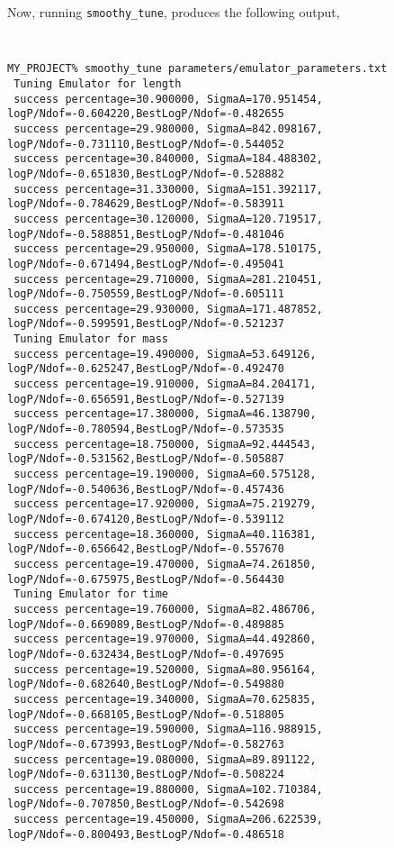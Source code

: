 \documentclass[UserManual.tex]{subfiles}
\begin{document}
Now, running {\tt smoothy\_tune}, produces the following output,

{\tt
\begin{verbatim}
MY_PROJECT% smoothy_tune parameters/emulator_parameters.txt
 Tuning Emulator for length
 success percentage=30.900000, SigmaA=170.951454, logP/Ndof=-0.604220,BestLogP/Ndof=-0.482655
 success percentage=29.980000, SigmaA=842.098167, logP/Ndof=-0.731110,BestLogP/Ndof=-0.544052
 success percentage=30.840000, SigmaA=184.488302, logP/Ndof=-0.651830,BestLogP/Ndof=-0.528882
 success percentage=31.330000, SigmaA=151.392117, logP/Ndof=-0.784629,BestLogP/Ndof=-0.583911
 success percentage=30.120000, SigmaA=120.719517, logP/Ndof=-0.588851,BestLogP/Ndof=-0.481046
 success percentage=29.950000, SigmaA=178.510175, logP/Ndof=-0.671494,BestLogP/Ndof=-0.495041
 success percentage=29.710000, SigmaA=281.210451, logP/Ndof=-0.750559,BestLogP/Ndof=-0.605111
 success percentage=29.930000, SigmaA=171.487852, logP/Ndof=-0.599591,BestLogP/Ndof=-0.521237
 Tuning Emulator for mass
 success percentage=19.490000, SigmaA=53.649126, logP/Ndof=-0.625247,BestLogP/Ndof=-0.492470
 success percentage=19.910000, SigmaA=84.204171, logP/Ndof=-0.656591,BestLogP/Ndof=-0.527139
 success percentage=17.380000, SigmaA=46.138790, logP/Ndof=-0.780594,BestLogP/Ndof=-0.573535
 success percentage=18.750000, SigmaA=92.444543, logP/Ndof=-0.531562,BestLogP/Ndof=-0.505887
 success percentage=19.190000, SigmaA=60.575128, logP/Ndof=-0.540636,BestLogP/Ndof=-0.457436
 success percentage=17.920000, SigmaA=75.219279, logP/Ndof=-0.674120,BestLogP/Ndof=-0.539112
 success percentage=18.360000, SigmaA=40.116381, logP/Ndof=-0.656642,BestLogP/Ndof=-0.557670
 success percentage=19.470000, SigmaA=74.261850, logP/Ndof=-0.675975,BestLogP/Ndof=-0.564430
 Tuning Emulator for time
 success percentage=19.760000, SigmaA=82.486706, logP/Ndof=-0.669089,BestLogP/Ndof=-0.489885
 success percentage=19.970000, SigmaA=44.492860, logP/Ndof=-0.632434,BestLogP/Ndof=-0.497695
 success percentage=19.520000, SigmaA=80.956164, logP/Ndof=-0.682640,BestLogP/Ndof=-0.549880
 success percentage=19.340000, SigmaA=70.625835, logP/Ndof=-0.668105,BestLogP/Ndof=-0.518805
 success percentage=19.590000, SigmaA=116.988915, logP/Ndof=-0.673993,BestLogP/Ndof=-0.582763
 success percentage=19.080000, SigmaA=89.891122, logP/Ndof=-0.631130,BestLogP/Ndof=-0.508224
 success percentage=19.880000, SigmaA=102.710384, logP/Ndof=-0.707850,BestLogP/Ndof=-0.542698
 success percentage=19.450000, SigmaA=206.622539, logP/Ndof=-0.800493,BestLogP/Ndof=-0.486518
\end{verbatim}
}
\end{document}
